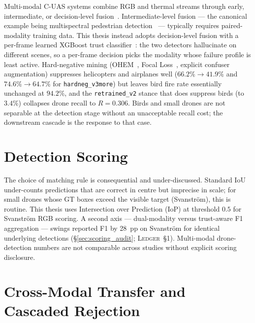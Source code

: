 Multi-modal C-UAS systems combine RGB and thermal streams through early, intermediate, or decision-level fusion~\cite{ramachandram2017fusion}. Intermediate-level fusion --- the canonical example being multispectral pedestrian detection~\cite{wagner2016multispectral} --- typically requires paired-modality training data. This thesis instead adopts decision-level fusion with a per-frame learned XGBoost trust classifier~\cite{chen2016xgboost,friedman2001greedy}: the two detectors hallucinate on different scenes, so a per-frame decision picks the modality whose failure profile is least active. Hard-negative mining (OHEM~\cite{shrivastava2016ohem}, Focal Loss~\cite{lin2017focal}, explicit confuser augmentation) suppresses helicopters and airplanes well ($66.2\% \to 41.9\%$ and $74.6\% \to 64.7\%$ for \texttt{hardneg\_v3more}) but leaves bird fire rate essentially unchanged at $94.2\%$, and the \texttt{retrained\_v2} stance that does suppress birds (to $3.4\%$) collapses drone recall to $R=0.306$. Birds and small drones are not separable at the detection stage without an unacceptable recall cost; the downstream cascade is the response to that case.

\section{Detection Scoring}
\label{sec:lit_calibration}

The choice of matching rule is consequential and under-discussed. Standard IoU under-counts predictions that are correct in centre but imprecise in scale; for small drones whose GT boxes exceed the visible target (Svanstr\"om), this is routine. This thesis uses Intersection over Prediction (IoP) at threshold $0.5$ for Svanstr\"om RGB scoring. A second axis --- dual-modality versus trust-aware F1 aggregation --- swings reported F1 by 28~pp on Svanstr\"om for identical underlying detections (\S\ref{sec:scoring_audit}; \textsc{Ledger}~\S1). Multi-modal drone-detection numbers are not comparable across studies without explicit scoring disclosure.

\section{Cross-Modal Transfer and Cascaded Rejection}
\label{sec:lit_xmodal_cascade}

